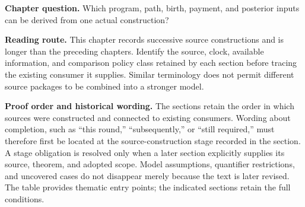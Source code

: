\documentclass[
  english,
  11pt,
  oneside]{book}
\begin{document}
\textbf{Chapter question.} Which program, path, birth, payment, and posterior inputs can be derived from one actual construction?

\textbf{Reading route.} This chapter records successive source constructions and is longer than the preceding chapters. Identify the source, clock, available information, and comparison policy class retained by each section before tracing the existing consumer it supplies. Similar terminology does not permit different source packages to be combined into a stronger model.

\textbf{Proof order and historical wording.} The sections retain the order in which sources were constructed and connected to existing consumers. Wording about completion, such as ``this round,'' ``subsequently,'' or ``still required,'' must therefore first be located at the source-construction stage recorded in the section. A stage obligation is resolved only when a later section explicitly supplies its source, theorem, and adopted scope. Model assumptions, quantifier restrictions, and uncovered cases do not disappear merely because the text is later revised. The table provides thematic entry points; the indicated sections retain the full conditions.
\end{document}
